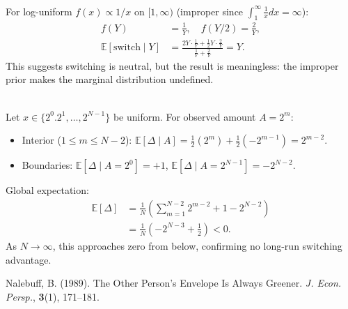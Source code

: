 \begin{technical}
\\[0.2em]
For log-uniform $f(x) \propto 1/x$ on $[1, \infty)$ (improper since $\int_1^{\infty} \frac{1}{x} dx = \infty$):
\begin{align*}
f(Y) &= \frac{1}{Y}, \quad f(Y/2) = \frac{2}{Y},\\
\mathbb{E}[\text{switch} \mid Y] &= \frac{2Y \cdot \frac{1}{Y} + \tfrac{1}{2}Y \cdot \frac{2}{Y}}{\frac{1}{Y} + \frac{2}{Y}} = Y.
\end{align*}
This suggests switching is neutral, but the result is meaningless: the improper prior makes the marginal distribution undefined. 

\\[0.2em]
Let $x \in \{2^0. 2^1, \dots, 2^{N-1}\}$ be uniform. For observed amount $A = 2^m$:
\begin{itemize}[topsep=0pt,itemsep=2pt]
\item Interior ($1 \le m \le N - 2$): $\mathbb{E}[\Delta \mid A] = \tfrac{1}{2}(2^m) + \tfrac{1}{2}(-2^{m-1}) = 2^{m-2}$.
\item Boundaries: $\mathbb{E}[\Delta \mid A = 2^0] = +1$, $\mathbb{E}[\Delta \mid A = 2^{N-1}] = -2^{N-2}$.
\end{itemize}
Global expectation:
\begin{align*}
\mathbb{E}[\Delta] &= \frac{1}{N} \left( \sum_{m=1}^{N-2} 2^{m-2} + 1 - 2^{N-2} \right) \\
&= \frac{1}{N} \left( -2^{N-3} + \tfrac{1}{2} \right) < 0.
\end{align*}
As $N \to \infty$, this approaches zero from below, confirming no long-run switching advantage.

\techref
{\footnotesize
Nalebuff, B. (1989). The Other Person's Envelope Is Always Greener. \textit{J. Econ. Persp.}, \textbf{3}(1), 171–181.
}
\end{technical}
